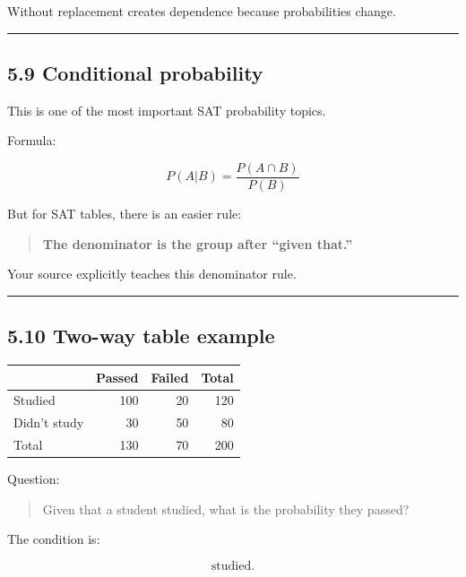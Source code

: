 \documentclass[
]{article}
\newcounter{none} %
\begin{document}
Without replacement creates dependence because probabilities change.

\begin{center}\rule{0.5\linewidth}{0.5pt}\end{center}

\subsection{5.9 Conditional probability}\label{conditional-probability}

This is one of the most important SAT probability topics.

Formula:

\[
\boxed{
P(A|B)
=
\frac{P(A\cap B)}
{P(B)}
}
\]

But for SAT tables, there is an easier rule:

\begin{quote}
\textbf{The denominator is the group after ``given that.''}
\end{quote}

Your source explicitly teaches this denominator rule.

\begin{center}\rule{0.5\linewidth}{0.5pt}\end{center}

\subsection{5.10 Two-way table example}\label{two-way-table-example}

{\def\LTcaptype{none} %
\begin{longtable}[]{@{}lrrr@{}}
\toprule\noalign{}
& Passed & Failed & Total \\
\midrule\noalign{}
\endhead
\bottomrule\noalign{}
\endlastfoot
Studied & 100 & 20 & 120 \\
Didn't study & 30 & 50 & 80 \\
Total & 130 & 70 & 200 \\
\end{longtable}
}

Question:

\begin{quote}
Given that a student studied, what is the probability they passed?
\end{quote}

The condition is:

\[
\boxed{\text{studied}}.
\]
\end{document}
